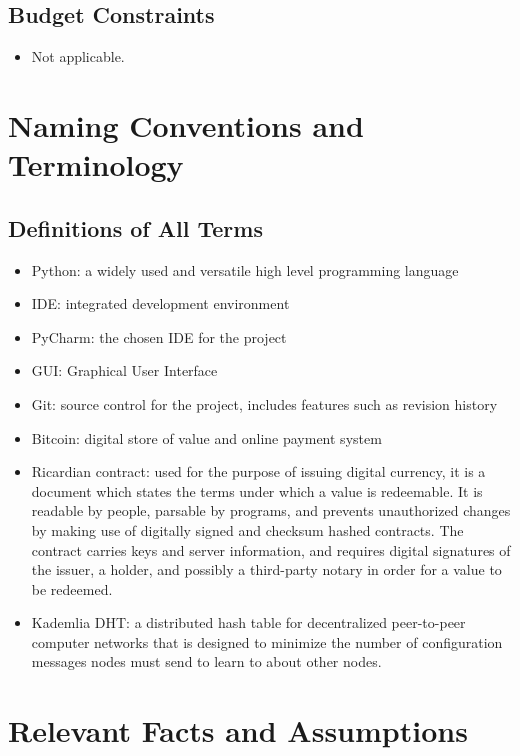 \documentclass{article}
\begin{document}
\subsection{Budget Constraints}
\begin{itemize}
	
\item
Not applicable.
	
\end{itemize}

\section{Naming Conventions and Terminology}
\subsection{Definitions of All Terms}
\begin{itemize}
	
\item
Python: a widely used and versatile high level programming language
\item
IDE: integrated development environment
\item
PyCharm: the chosen IDE for the project	
\item
GUI: Graphical User Interface
\item
Git: source control for the project, includes features such as revision history
\item
Bitcoin: digital store of value and online payment system
\item
Ricardian contract: used for the purpose of issuing digital currency, it is a document which states the terms under which a value is redeemable. It is readable by people, parsable by programs, and prevents unauthorized changes by making use of digitally signed and checksum hashed contracts. The contract carries keys and server information, and requires digital signatures of the issuer, a holder, and possibly a third-party notary in order for a value to be redeemed.
\item
Kademlia DHT: a distributed hash table for decentralized peer-to-peer computer networks that is designed to minimize the number of configuration messages nodes must send to learn to about other nodes.

\end{itemize}

\section{Relevant Facts and Assumptions}
\end{document}

